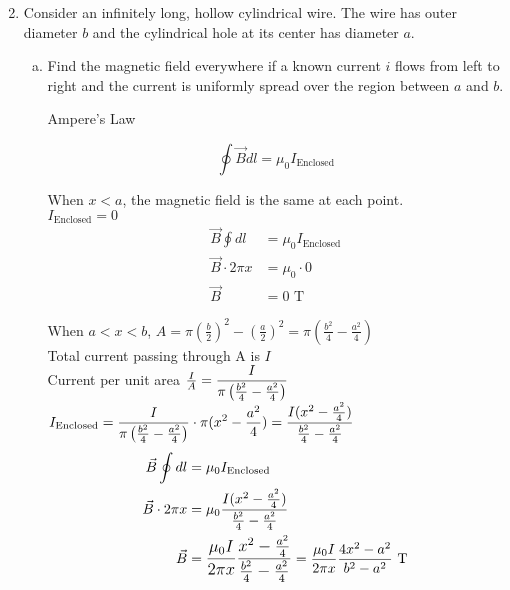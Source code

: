 \documentclass[fleqn]{article}
\begin{document}
	\begin{enumerate}
		\setcounter{enumi}{1}
		\item 
			Consider an infinitely long, hollow cylindrical wire. The wire has outer diameter $b$ and the cylindrical hole at its center has diameter $a$.
			\begin{enumerate}[a)]
				\item 
					Find the magnetic field everywhere if a known current $i$ flows from left to right and the current is uniformly spread over the region between $a$ and $b$.\\
					\begin{center}
						Ampere's Law
					\end{center}
					$$\oint\vec{B}dl = \mu_0I_{\text{Enclosed}}$$

					When $x<a$, the magnetic field is the same at each point.\\
					$I_{\text{Enclosed}} = 0$
					\begin{align*}
						\vec{B}\oint dl &= \mu_0I_{\text{Enclosed}}\\
						\vec{B}\cdot2\pi x &= \mu_0 \cdot 0\\
						\vec{B} &= 0\text{ T}
					\end{align*}

					When $a<x<b$,
					$A = \pi \left(\frac{b}{2}\right)^2 - \left(\frac{a}{2}\right)^2 = \pi\left( \frac{b^2}{4} - \frac{a^2}{4} \right)$\\
					Total current passing through A is $I$\\
					Current per unit area $\frac{I}{A} = \mathlarger{\frac{I}{\pi\left( \frac{b^2}{4} - \frac{a^2}{4} \right)}}$\\
					$I_{\text{Enclosed}} = \mathlarger{\frac{I}{\pi\left( \frac{b^2}{4} - \frac{a^2}{4} \right)} \cdot \pi( x^2 - \frac{a^2}{4} ) = \frac{I( x^2 - \frac{a^2}{4} )}{\frac{b^2}{4} - \frac{a^2}{4}}}$
					\begin{align*}
						\vec{B}\oint dl &= \mu_0I_{\text{Enclosed}}\\
						\vec{B}\cdot2\pi x &= \mu_0 \frac{I( x^2 - \frac{a^2}{4} )}{\frac{b^2}{4} - \frac{a^2}{4}}\\
						\vec{B} &= \mathlarger{\frac{\mu_0 I}{2\pi x}\frac{x^2 - \frac{a^2}{4}}{\frac{b^2}{4} - \frac{a^2}{4}}} = \frac{\mu_0 I}{2\pi x}\frac{4x^2 - a^2}{b^2 - a^2}\text{ T}
					\end{align*}


\end{enumerate}
\end{enumerate}
\end{document}
